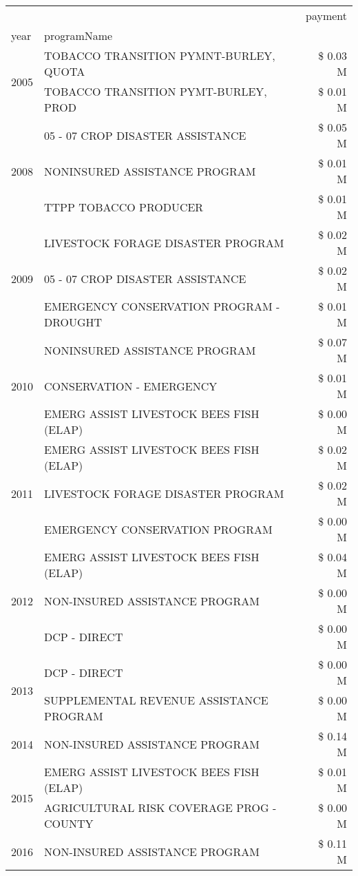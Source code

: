 \begin{tabular}{llr}
\toprule
 &  & payment \\
year & programName &  \\
\midrule
\multirow[t]{2}{*}{2005} & TOBACCO TRANSITION PYMNT-BURLEY, QUOTA & \$ 0.03 M \\
 & TOBACCO TRANSITION PYMT-BURLEY, PROD & \$ 0.01 M \\
\cline{1-3}
\multirow[t]{3}{*}{2008} & 05 - 07 CROP DISASTER ASSISTANCE & \$ 0.05 M \\
 & NONINSURED ASSISTANCE PROGRAM & \$ 0.01 M \\
 & TTPP TOBACCO PRODUCER & \$ 0.01 M \\
\cline{1-3}
\multirow[t]{3}{*}{2009} & LIVESTOCK FORAGE DISASTER  PROGRAM & \$ 0.02 M \\
 & 05 - 07 CROP DISASTER ASSISTANCE & \$ 0.02 M \\
 & EMERGENCY CONSERVATION PROGRAM - DROUGHT & \$ 0.01 M \\
\cline{1-3}
\multirow[t]{3}{*}{2010} & NONINSURED ASSISTANCE PROGRAM & \$ 0.07 M \\
 & CONSERVATION - EMERGENCY & \$ 0.01 M \\
 & EMERG ASSIST LIVESTOCK BEES FISH (ELAP) & \$ 0.00 M \\
\cline{1-3}
\multirow[t]{3}{*}{2011} & EMERG ASSIST LIVESTOCK BEES FISH (ELAP) & \$ 0.02 M \\
 & LIVESTOCK FORAGE DISASTER PROGRAM & \$ 0.02 M \\
 & EMERGENCY CONSERVATION PROGRAM & \$ 0.00 M \\
\cline{1-3}
\multirow[t]{3}{*}{2012} & EMERG ASSIST LIVESTOCK BEES FISH (ELAP) & \$ 0.04 M \\
 & NON-INSURED ASSISTANCE PROGRAM & \$ 0.00 M \\
 & DCP - DIRECT & \$ 0.00 M \\
\cline{1-3}
\multirow[t]{2}{*}{2013} & DCP - DIRECT & \$ 0.00 M \\
 & SUPPLEMENTAL REVENUE ASSISTANCE PROGRAM & \$ 0.00 M \\
\cline{1-3}
2014 & NON-INSURED ASSISTANCE PROGRAM & \$ 0.14 M \\
\cline{1-3}
\multirow[t]{2}{*}{2015} & EMERG ASSIST LIVESTOCK BEES FISH (ELAP) & \$ 0.01 M \\
 & AGRICULTURAL RISK COVERAGE PROG - COUNTY & \$ 0.00 M \\
\cline{1-3}
\multirow[t]{3}{*}{2016} & NON-INSURED ASSISTANCE PROGRAM & \$ 0.11 M \\

\end{tabular}

